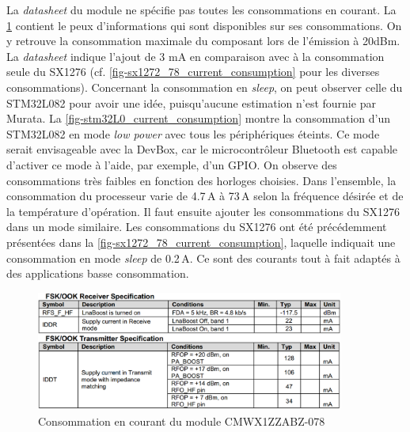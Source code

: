 La \textit{datasheet} du module ne spécifie pas toutes les consommations en courant. La \cref{fig-murata_current_consumption} contient le peux d'informations qui sont disponibles sur ses consommations. On y retrouve la consommation maximale du composant lors de l'émission à 20dBm. La \textit{datasheet} indique l'ajout de 3 mA en comparaison avec à la consommation seule du SX1276 (cf. \cref{fig-sx1272_78_current_consumption} pour les diverses consommations). Concernant la consommation en \textit{sleep}, on peut observer celle du STM32L082 pour avoir une idée, puisqu'aucune estimation n'est fournie par Murata. La \cref{fig-stm32L0_current_consumption} montre la consommation d'un STM32L082 en mode \textit{low power} avec tous les périphériques éteints. Ce mode serait envisageable avec la DevBox, car le microcontrôleur Bluetooth est capable d'activer ce mode à l'aide, par exemple, d'un GPIO. On observe des consommations très faibles en fonction des horloges choisies. Dans l'ensemble, la consommation du processeur varie de 4.7\,\si{\micro}A à 73\,\si{\micro}A selon la fréquence désirée et de la température d'opération. Il faut ensuite ajouter les consommations du SX1276 dans un mode similaire. Les consommations du SX1276 ont été précédemment présentées dans la \cref{fig-sx1272_78_current_consumption}, laquelle indiquait une consommation en mode \textit{sleep} de 0.2\,\si{\micro}A. Ce sont des courants tout à fait adaptés à des applications basse consommation. \\

\begin{figure}[ht!]
    \centering
    \includegraphics[width=0.9\textwidth]{Figures/Hardware/murata_current_consumption.PNG}
    \caption{Consommation en courant du module CMWX1ZZABZ-078}
    \label{fig-murata_current_consumption}
\end{figure}

